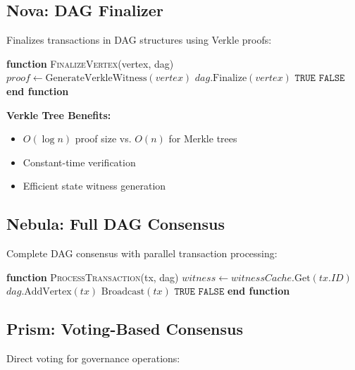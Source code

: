 \documentclass[11pt]{article}
\begin{document}
\subsection{Nova: DAG Finalizer}

Finalizes transactions in DAG structures using Verkle proofs:



\begin{algorithmic}[1]
\State \textbf{function} \textsc{FinalizeVertex}(vertex, dag)
    \State $proof \gets \text{GenerateVerkleWitness}(vertex)$
        \State $dag.\text{Finalize}(vertex)$
        \State \Return $\texttt{TRUE}$
    \EndIf
    \State \Return $\texttt{FALSE}$
\State \textbf{end function}
\end{algorithmic}


\textbf{Verkle Tree Benefits:}
\begin{itemize}
\item $O(\log n)$ proof size vs. $O(n)$ for Merkle trees
\item Constant-time verification
\item Efficient state witness generation
\end{itemize}

\subsection{Nebula: Full DAG Consensus}

Complete DAG consensus with parallel transaction processing:



\begin{algorithmic}[1]
\State \textbf{function} \textsc{ProcessTransaction}(tx, dag)
    \State $witness \gets witnessCache.\text{Get}(tx.ID)$
        \State $dag.\text{AddVertex}(tx)$
        \State $\text{Broadcast}(tx)$ 
        \State \Return $\texttt{TRUE}$
    \EndIf
    \State \Return $\texttt{FALSE}$
\State \textbf{end function}
\end{algorithmic}


\subsection{Prism: Voting-Based Consensus}

Direct voting for governance operations:
\end{document}
